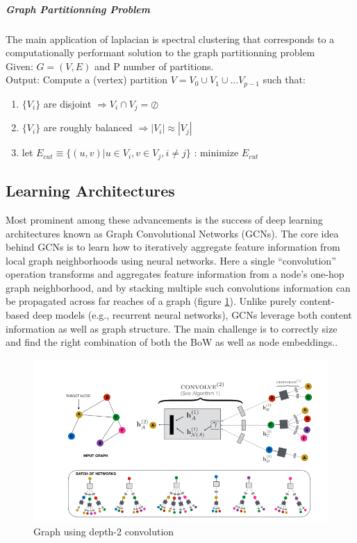 \documentclass{report}
\begin{document}
\subparagraph{Graph Partitionning Problem}
The main application of laplacian is spectral clustering that corresponds to a computationally performant solution to the graph partitionning problem \\
Given: 
$G = (V, E) $ and  P number of partitions.\\ Output:
	Compute a (vertex) partition $V=V_0 \cup V_1 \cup ... V_{p-1}$ such that:
	\begin{enumerate}
	\item $ \{V_i \} $ are disjoint $\Rightarrow V_i \cap V_j = \oslash$
	\item $ \{V_i \} $ are roughly balanced $\Rightarrow |V_i| \approx |V_j| $
	\item let $E_{cut} \equiv \{ (u,v) | u \in V_i, v \in V_j, i \neq j\} $ :  minimize $E_{cut}$
	\end{enumerate}


\subsection{Learning Architectures}
Most prominent among these advancements is the success
of deep learning architectures known as Graph Convolutional
Networks (GCNs). The core idea behind GCNs is
to learn how to iteratively aggregate feature information from local
graph neighborhoods using neural networks. Here a
single “convolution” operation transforms and aggregates feature
information from a node’s one-hop graph neighborhood, and by
stacking multiple such convolutions information can be propagated
across far reaches of a graph (figure \ref{fig:conv}). Unlike purely content-based deep
models (e.g., recurrent neural networks), GCNs leverage both
content information as well as graph structure. 
The main challenge is to correctly size and find the right combination of both the BoW as well as node embeddings.\cite{deep_GCN}.


\begin{figure}[htbp]
\centering
\includegraphics[scale=0.4]{gconv.png}
\caption{Graph using depth-2 convolution}
\label{fig:conv}
\end{figure}
\end{document}
